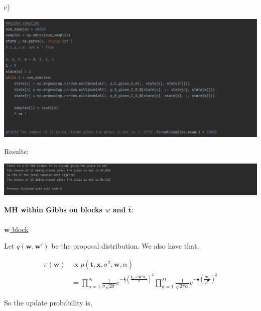 \documentclass[10pt]{homeworg}
\begin{document}
c)
\begin{center}
\includegraphics[scale=0.7]{figures/q3_c.PNG}
\end{center}

Results:
\begin{center}
\includegraphics[scale=0.7]{figures/q3_results.PNG}
\end{center}



\exercise 
\textbf{MH within Gibbs on blocks $w$ and $\hat{\boldsymbol t}$}:\\
\\
\underline{$\boldsymbol w$ block}

Let $q(\boldsymbol w,\boldsymbol w')$ be the proposal distribution. We also have that,

\begin{align*}
\pi(\boldsymbol w) &\propto p(\boldsymbol t,\boldsymbol x,\sigma^2,\boldsymbol w,\alpha)\\
	   &= \prod_{n=1}^N \frac{1}{\sigma \sqrt{2\pi}} e^{-\frac{1}{2}(\frac{\boldsymbol t_n-\boldsymbol w^T \boldsymbol x_n}{\sigma})^2} \prod_{d=1}^D \frac{1}{\sqrt{2\pi\alpha}} e^{-\frac{1}{2} (\frac{\boldsymbol w_d}{\sqrt{\alpha}})^2}
\end{align*}

So the update probability is,
\end{document}
